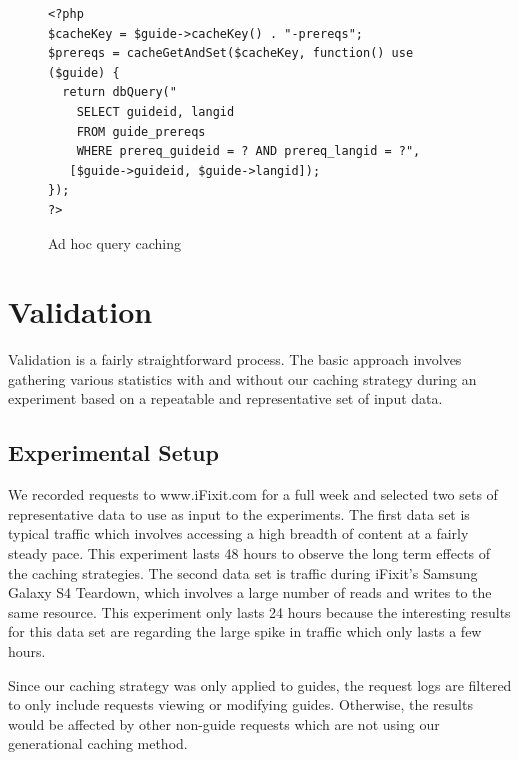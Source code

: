 \documentclass[12pt]{ucthesis}
\begin{document}
\begin{figure}[h]
\begin{ssp}
\begin{verbatim}
<?php
$cacheKey = $guide->cacheKey() . "-prereqs";
$prereqs = cacheGetAndSet($cacheKey, function() use ($guide) {
  return dbQuery("
    SELECT guideid, langid
    FROM guide_prereqs
    WHERE prereq_guideid = ? AND prereq_langid = ?",
   [$guide->guideid, $guide->langid]);
});
?>
\end{verbatim}
\caption{Ad hoc query caching}
\label{fig:adHocQueryCaching}
\end{ssp}
\end{figure}


\chapter{Validation} \label{validation}
Validation is a fairly straightforward process.
The basic approach involves gathering various statistics with and without our caching strategy during an experiment based on a repeatable and representative set of input data.

\section{Experimental Setup}
We recorded requests to \textsf{www.iFixit.com} for a full week and selected two sets of representative data to use as input to the experiments.
The first data set is typical traffic which involves accessing a high breadth of content at a fairly steady pace.
This experiment lasts 48 hours to observe the long term effects of the caching strategies.
The second data set is traffic during \textsf{iFixit}'s Samsung Galaxy S4 Teardown\cite{ifixitGalaxyS4Teardown}, which involves a large number of reads and writes to the same resource.
This experiment only lasts 24 hours because the interesting results for this data set are regarding the large spike in traffic which only lasts a few hours.

Since our caching strategy was only applied to guides, the request logs are filtered to only include requests viewing or modifying guides.
Otherwise, the results would be affected by other non-guide requests which are not using our generational caching method.
\end{document}
